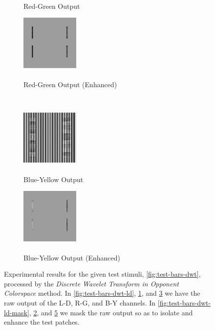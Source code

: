 \documentclass[journal,onecolumn]{IEEEtran}
\begin{document}
{\begin{figure}[H]
\begin{subfigure}[b]{0.5\textwidth}
            \caption{\\ Red-Green Output}
            \label{fig:test-bars-dwt-rg}
    \end{subfigure}%
    \begin{subfigure}[b]{0.5\textwidth}
            \centering
            \includegraphics[width=108px, frame]{test-bars-dwt-rg-mask}
            \caption{\\ Red-Green Output (Enhanced)}
            \label{fig:test-bars-dwt-rg-mask}
    \end{subfigure}\\
    \begin{subfigure}[b]{0.5\textwidth}
            \centering
            \includegraphics[width=108px, frame]{test-bars-dwt-by}
            \caption{\\ Blue-Yellow Output}
            \label{fig:test-bars-dwt-by}
    \end{subfigure}%
    \begin{subfigure}[b]{0.5\textwidth}
            \centering
            \includegraphics[width=108px, frame]{test-bars-dwt-by-mask}
            \caption{\\ Blue-Yellow Output (Enhanced)}
            \label{fig:test-bars-dwt-by-mask}
    \end{subfigure}
    \caption{Experimental results for the given test stimuli, \ref{fig:test-bars-dwt}, processed by the \textit{Discrete Wavelet Transform in Opponent Colorspace} method. In \ref{fig:test-bars-dwt-ld}, \ref{fig:test-bars-dwt-rg}, and \ref{fig:test-bars-dwt-by} we have the raw output of the L-D, R-G, and B-Y channels. In \ref{fig:test-bars-dwt-ld-mask}, \ref{fig:test-bars-dwt-rg-mask}, and \ref{fig:test-bars-dwt-by-mask} we mask the raw output so as to isolate and enhance the test patches.}
\end{figure}
\clearpage
}
\end{document}
